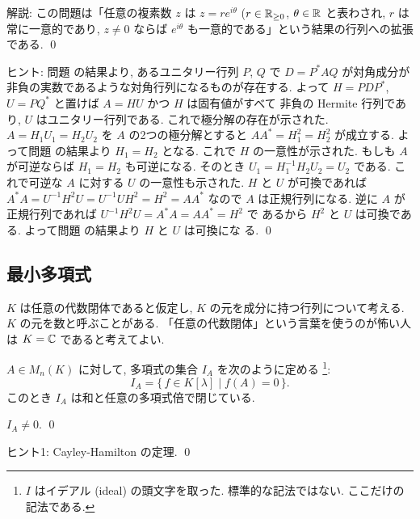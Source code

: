 \documentclass[12pt,twoside]{jarticle}
\begin{document}
\noindent
解説: この問題は「任意の複素数 $z$ は $z=re^{i\theta}$ ($r\in{\mathbb R}_{\ge0}$,
$\theta\in{\mathbb R}$ と表わされ, $r$ は常に一意的であり, 
$z\ne 0$ ならば $e^{i\theta}$ も一意的である」という結果の行列への拡張である.
\qed

\medskip
\noindent
ヒント: 問題  の結果より, あるユニタリー行列 $P$, $Q$ 
で $D=P^*AQ$ が対角成分が非負の実数であるような対角行列になるものが存在する.
よって $H=PDP^*$, $U=PQ^*$ と置けば $A=HU$ かつ $H$ は固有値がすべて
非負の Hermite 行列であり, $U$ はユニタリー行列である.
これで極分解の存在が示された.
$A=H_1U_1=H_2U_2$ を $A$ の2つの極分解とすると $AA^*=H_1^2=H_2^2$ が成立する.
よって問題  の結果より $H_1=H_2$ となる.
これで $H$ の一意性が示された.
もしも $A$ が可逆ならば $H_1=H_2$ も可逆になる.
そのとき $U_1=H_1^{-1}H_2U_2=U_2$ である.
これで可逆な $A$ に対する $U$ の一意性も示された.
$H$ と $U$ が可換であれば $A^*A=U^{-1}H^2U=U^{-1}UH^2=H^2=AA^*$ なので $A$ 
は正規行列になる.  逆に $A$ が正規行列であれば $U^{-1}H^2U=A^*A=AA^*=H^2$ で
あるから $H^2$ と $U$ は可換である. 
よって問題  の結果より $H$ と $U$ は可換にな
る. 
\qed


\subsection{最小多項式}
\label{sec:minimal-polynomial}

$K$ は任意の代数閉体であると仮定し, $K$ の元を成分に持つ行列について考える.
$K$ の元を数と呼ぶことがある. 「任意の代数閉体」という言葉を使うのが怖い人
は $K={\mathbb C}$ であると考えてよい.

$A\in M_n(K)$ に対して, 多項式の集合 $I_A$ を次のように定める%
\footnote{$I$ はイデアル (ideal) の頭文字を取った.  標準的な記法ではない.
  ここだけの記法である.}:
\begin{equation*}
  I_A = \{\, f\in K[\lambda] \mid f(A) = 0 \,\}.
\end{equation*}
このとき $I_A$ は和と任意の多項式倍で閉じている.


\begin{question}
\label{q:minimal-polyn-1}
  $I_A\ne 0$. \qed
\end{question}

\noindent
ヒント1: Cayley-Hamilton の定理.
\qed
\end{document}
